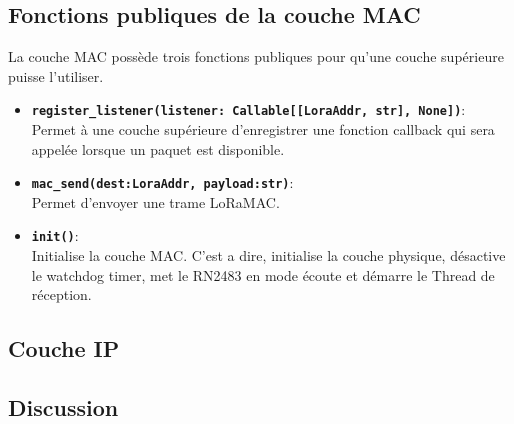     \subsection*{Fonctions publiques de la couche MAC}
        La couche MAC possède trois fonctions publiques pour qu'une couche supérieure puisse l'utiliser.
        \begin{itemize}
            \item \textbf{\texttt{register\_listener(listener: Callable[[LoraAddr, str], None])}}:\\
                Permet à une couche supérieure d'enregistrer une fonction callback qui sera appelée lorsque un paquet est disponible.
            \item \textbf{\texttt{mac\_send(dest:LoraAddr, payload:str)}}:\\
                Permet d'envoyer une trame LoRaMAC.
            \item \textbf{\texttt{init()}}:\\
                Initialise la couche MAC. C'est a dire, initialise la couche physique,
                désactive le watchdog timer, met le RN2483 en mode écoute et démarre le Thread de réception.
        \end{itemize}
        
\subsection*{Couche IP}\label{subsec:work-loraroot:iplayer}

\subsection*{Discussion}
